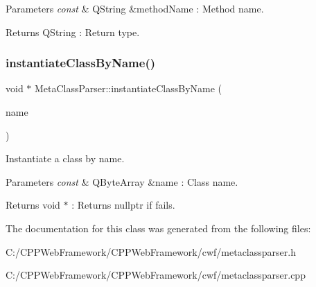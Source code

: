 \begin{DoxyParams}{Parameters}
{\em const} & Q\+String \&method\+Name \+: Method name. \\
\hline
\end{DoxyParams}
\begin{DoxyReturn}{Returns}
Q\+String \+: Return type. 
\end{DoxyReturn}
\mbox{\label{class_meta_class_parser_a1441f0bf6e0db301ea726279d535c49b}} 
\subsubsection{\texorpdfstring{instantiate\+Class\+By\+Name()}{instantiateClassByName()}}
{\footnotesize\ttfamily void $\ast$ Meta\+Class\+Parser\+::instantiate\+Class\+By\+Name (\begin{DoxyParamCaption}\item[{const Q\+Byte\+Array \&}]{name }\end{DoxyParamCaption})\hspace{0.3cm}{\ttfamily [static]}}



Instantiate a class by name. 


\begin{DoxyParams}{Parameters}
{\em const} & Q\+Byte\+Array \&name \+: Class name. \\
\hline
\end{DoxyParams}
\begin{DoxyReturn}{Returns}
void $\ast$ \+: Returns nullptr if fails. 
\end{DoxyReturn}


The documentation for this class was generated from the following files\+:\begin{DoxyCompactItemize}
\item 
C\+:/\+C\+P\+P\+Web\+Framework/\+C\+P\+P\+Web\+Framework/cwf/metaclassparser.\+h\item 
C\+:/\+C\+P\+P\+Web\+Framework/\+C\+P\+P\+Web\+Framework/cwf/metaclassparser.\+cpp\end{DoxyCompactItemize}
